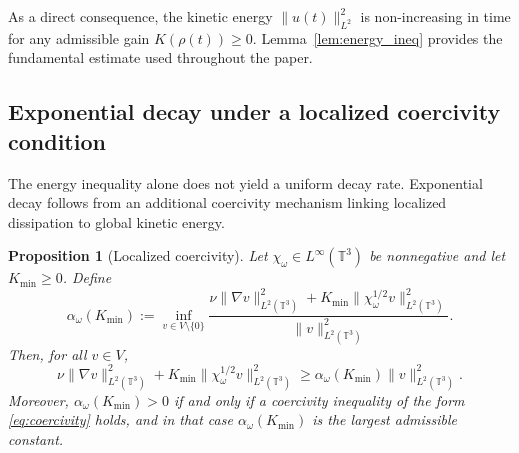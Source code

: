 \documentclass[preprint,12pt]{elsarticle}
\newtheorem{proposition}  [theorem]{Proposition}
\begin{document}
As a direct consequence, the kinetic energy $\|u(t)\|_{L^2}^2$ is
non-increasing in time for any admissible gain $K(\rho(t))\ge 0$.
Lemma~\ref{lem:energy_ineq} provides the fundamental estimate used throughout
the paper.

\subsection{Exponential decay under a localized coercivity condition}

The energy inequality alone does not yield a uniform decay rate.
Exponential decay follows from an additional coercivity mechanism linking
localized dissipation to global kinetic energy.

\begin{proposition}[Localized coercivity]
\label{prop:coercivity_optimal}
Let $\chi_\omega\in L^\infty(\mathbb{T}^3)$ be nonnegative and let
$K_{\min}\ge 0$.
Define
\begin{equation}
\label{eq:alphaomega_def}
\alpha_\omega(K_{\min})
:=
\inf_{v\in V\setminus\{0\}}
\frac{
\nu \|\nabla v\|_{L^2(\mathbb{T}^3)}^2
+
K_{\min}\|\chi_\omega^{1/2} v\|_{L^2(\mathbb{T}^3)}^2
}{
\|v\|_{L^2(\mathbb{T}^3)}^2
}.
\end{equation}
Then, for all $v\in V$,
\begin{equation}
\label{eq:coercivity}
\nu \|\nabla v\|_{L^2(\mathbb{T}^3)}^2
+
K_{\min}\|\chi_\omega^{1/2} v\|_{L^2(\mathbb{T}^3)}^2
\ge
\alpha_\omega(K_{\min}) \|v\|_{L^2(\mathbb{T}^3)}^2.
\end{equation}
Moreover, $\alpha_\omega(K_{\min})>0$ if and only if a coercivity inequality of
the form \eqref{eq:coercivity} holds, and in that case
$\alpha_\omega(K_{\min})$ is the largest admissible constant.
\end{proposition}
\end{document}
